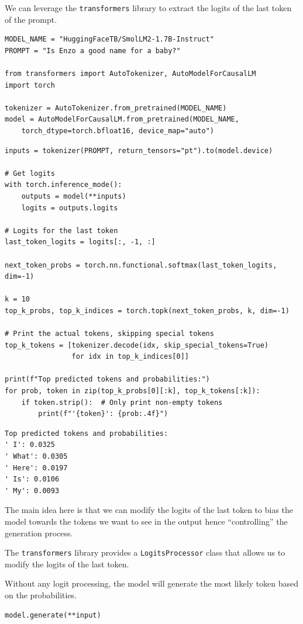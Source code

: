 We can leverage the \texttt{transformers} library to extract the logits of the last token of the prompt.

\begin{verbatim}
MODEL_NAME = "HuggingFaceTB/SmolLM2-1.7B-Instruct"
PROMPT = "Is Enzo a good name for a baby?"

from transformers import AutoTokenizer, AutoModelForCausalLM
import torch

tokenizer = AutoTokenizer.from_pretrained(MODEL_NAME)
model = AutoModelForCausalLM.from_pretrained(MODEL_NAME, 
    torch_dtype=torch.bfloat16, device_map="auto")
\end{verbatim}

\begin{verbatim}
inputs = tokenizer(PROMPT, return_tensors="pt").to(model.device)

# Get logits
with torch.inference_mode():
    outputs = model(**inputs)
    logits = outputs.logits

# Logits for the last token
last_token_logits = logits[:, -1, :]

next_token_probs = torch.nn.functional.softmax(last_token_logits, dim=-1)

k = 10
top_k_probs, top_k_indices = torch.topk(next_token_probs, k, dim=-1)

# Print the actual tokens, skipping special tokens
top_k_tokens = [tokenizer.decode(idx, skip_special_tokens=True) 
                for idx in top_k_indices[0]]

print(f"Top predicted tokens and probabilities:")
for prob, token in zip(top_k_probs[0][:k], top_k_tokens[:k]):
    if token.strip():  # Only print non-empty tokens
        print(f"'{token}': {prob:.4f}")
\end{verbatim}

\begin{verbatim}
Top predicted tokens and probabilities:
' I': 0.0325
' What': 0.0305
' Here': 0.0197
' Is': 0.0106
' My': 0.0093
\end{verbatim}

The main idea here is that we can modify the logits of the last token to bias the model towards the tokens we want to see in the output hence ``controlling'' the generation process.

The \texttt{transformers} library provides a \texttt{LogitsProcessor} class that allows us to modify the logits of the last token.

Without any logit processing, the model will generate the most likely token based on the probabilities.
\begin{verbatim}
model.generate(**input)
\end{verbatim}


